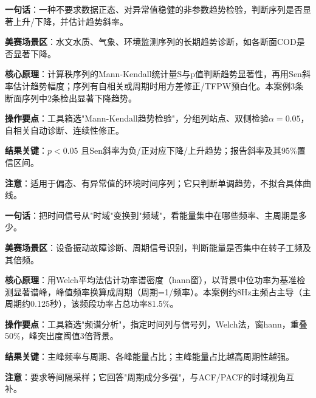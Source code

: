 
\begin{algobrief}
\textbf{一句话}：一种不要求数据正态、对异常值稳健的非参数趋势检验，判断序列是否显著上升/下降，并估计趋势斜率。

\textbf{美赛场景区}：水文水质、气象、环境监测序列的长期趋势诊断，如各断面COD是否显著下降。

\textbf{核心原理}：计算秩序列的Mann-Kendall统计量S与p值判断趋势显著性，再用Sen斜率估计趋势幅度；序列有自相关或周期时用方差修正/TFPW预白化。本案例3条断面序列中2条检出显著下降趋势。

\textbf{操作要点}：工具箱选"Mann-Kendall趋势检验"，分组列站点、双侧检验$\alpha=0.05$，自相关自动诊断、连续性修正。

\textbf{结果关键}：$p<0.05$ 且Sen斜率为负/正对应下降/上升趋势；报告斜率及其95\%置信区间。

\textbf{注意}：适用于偏态、有异常值的环境时间序列；它只判断单调趋势，不拟合具体曲线。
\end{algobrief}


\begin{algobrief}
\textbf{一句话}：把时间信号从"时域"变换到"频域"，看能量集中在哪些频率、主周期是多少。

\textbf{美赛场景区}：设备振动故障诊断、周期信号识别，判断能量是否集中在转子工频及其倍频。

\textbf{核心原理}：用Welch平均法估计功率谱密度（hann窗），以背景中位功率为基准检测显著谱峰，峰值频率换算成周期（周期=1/频率）。本案例约8Hz主频占主导（主周期约0.125秒），该频段功率占总功率81.5\%。

\textbf{操作要点}：工具箱选"频谱分析"，指定时间列与信号列，Welch法，窗hann，重叠50\%，峰突出度阈值3倍背景。

\textbf{结果关键}：主峰频率与周期、各峰能量占比；主峰能量占比越高周期性越强。

\textbf{注意}：要求等间隔采样；它回答"周期成分多强"，与ACF/PACF的时域视角互补。
\end{algobrief}


